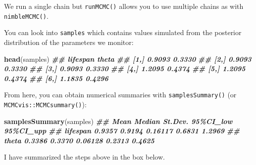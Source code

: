 \documentclass[
  12pt,
]{krantz}
\newenvironment{Shaded}{\begin{snugshade}}{\end{snugshade}}
\newcommand{\DocumentationTok}[1]{\textcolor[rgb]{0.56,0.35,0.01}{\textbf{\textit{#1}}}}
\newcommand{\FunctionTok}[1]{\textcolor[rgb]{0.13,0.29,0.53}{\textbf{#1}}}
\newcommand{\NormalTok}[1]{#1}
\begin{document}
We run a single chain but \texttt{runMCMC()} allows you to use multiple chains as with \texttt{nimbleMCMC()}.

You can look into \texttt{samples} which contains values simulated from the posterior distribution of the parameters we monitor:

\begin{Shaded}
\begin{Highlighting}[]
\FunctionTok{head}\NormalTok{(samples)}
\DocumentationTok{\#\#      lifespan  theta}
\DocumentationTok{\#\# [1,]   0.9093 0.3330}
\DocumentationTok{\#\# [2,]   0.9093 0.3330}
\DocumentationTok{\#\# [3,]   0.9093 0.3330}
\DocumentationTok{\#\# [4,]   1.2095 0.4374}
\DocumentationTok{\#\# [5,]   1.2095 0.4374}
\DocumentationTok{\#\# [6,]   1.1835 0.4296}
\end{Highlighting}
\end{Shaded}

From here, you can obtain numerical summaries with \texttt{samplesSummary()} (or \texttt{MCMCvis::MCMCsummary()}):

\begin{Shaded}
\begin{Highlighting}[]
\FunctionTok{samplesSummary}\NormalTok{(samples)}
\DocumentationTok{\#\#            Mean Median St.Dev. 95\%CI\_low 95\%CI\_upp}
\DocumentationTok{\#\# lifespan 0.9357 0.9194 0.16117    0.6831    1.2969}
\DocumentationTok{\#\# theta    0.3386 0.3370 0.06128    0.2313    0.4625}
\end{Highlighting}
\end{Shaded}

I have summarized the steps above in the box below.
\end{document}
